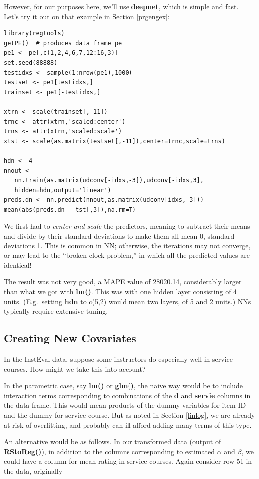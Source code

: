 However, for our purposes here, we'll use \textbf{deepnet}, which is
simple and fast.  Let's try it out on that example in Section
\ref{prgengex}:

\begin{lstlisting}
library(regtools) 
getPE()  # produces data frame pe 
pe1 <- pe[,c(1,2,4,6,7,12:16,3)] 
set.seed(88888) 
testidxs <- sample(1:nrow(pe1),1000) 
testset <- pe1[testidxs,] 
trainset <- pe1[-testidxs,] 

xtrn <- scale(trainset[,-11])
trnc <- attr(xtrn,'scaled:center')
trns <- attr(xtrn,'scaled:scale')
xtst <- scale(as.matrix(testset[,-11]),center=trnc,scale=trns)

hdn <- 4
nnout <-
   nn.train(as.matrix(udconv[-idxs,-3]),udconv[-idxs,3],
   hidden=hdn,output='linear')
preds.dn <- nn.predict(nnout,as.matrix(udconv[idxs,-3]))
mean(abs(preds.dn - tst[,3]),na.rm=T)  
\end{lstlisting}

We first had to \textit{center and scale} the predictors, meaning to
subtract their means and divide by their standard deviations to make
them all mean 0, standard deviations 1.  This is common in NN;
otherwise, the iterations may not converge, or may lead to the ``broken
clock problem,'' in which all the predicted values are identical!

The result was not very good, a MAPE value of 28020.14, considerably
larger than what we got with \textbf{lm()}.  This was with one hidden
layer consisting of 4 units.  (E.g.\ setting \textbf{hdn} to c(5,2)
would mean two layers, of 5 and 2 units.)  NNs typically require
extensive tuning.

\subsection{Creating New Covariates}

In the InstEval data, suppose some instructors do especially well in
service courses.  How might we take this into account?

In the parametric case, say \textbf{lm()} or \textbf{glm()},
the naive way would be to include interaction terms corresponding to
combinations of the \textbf{d} and \textbf{servie} columns in the data
frame.  This would mean products of the dummy variables for item ID and
the dummy for service course.  But as noted in Section \ref{linlog}, we
are already at risk of overfitting, and probably can ill afford adding
many terms of this type.

An alternative would be as follows.  In our transformed data (output of
\textbf{RStoReg()}), in addition to the columns corresponding to
estimated $\alpha$ and $\beta$, we could have a column for mean rating
in service courses.  Again consider row 51 in the data, originally

